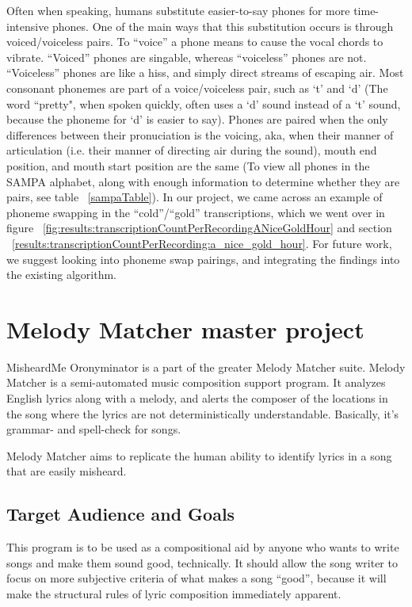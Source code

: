 Often when speaking, humans substitute easier-to-say phones for more time-intensive phones.  One of the main ways that this substitution occurs is through voiced/voiceless pairs.  To “voice” a phone means to cause the vocal chords to vibrate.  “Voiced” phones are singable, whereas “voiceless” phones are not.  “Voiceless” phones are like a hiss, and simply direct streams of escaping air.  Most consonant phonemes are part of a voice/voiceless pair, such as `t' and `d' (The word ``pretty", when spoken quickly, often uses a `d' sound instead of a `t' sound, because the phoneme for `d' is easier to say). Phones are paired when the only differences between their pronuciation is the voicing, aka, when their manner of articulation (i.e. their manner of directing air during the sound), mouth end position, and mouth start position are the same (To view all phones in the SAMPA alphabet, along with enough information to determine whether they are pairs, see table ~\ref{sampaTable}). In our project, we came across an example of phoneme swapping in the ``cold''/``gold'' transcriptions, which we went over in figure ~\ref{fig:results:transcriptionCountPerRecordingANiceGoldHour} and section ~\ref{results:transcriptionCountPerRecording:a_nice_gold_hour}. For future work, we suggest looking into phoneme swap pairings, and integrating the findings into the existing algorithm. 


\section{Melody Matcher master project}
\label{melodyMatcherMasterProject}
MisheardMe Oronyminator is a part of the greater Melody Matcher suite. Melody Matcher is a semi-automated music composition support program. It analyzes English lyrics along with a melody, and alerts the composer of the locations in the song where the lyrics are not deterministically understandable. Basically, it's grammar- and spell-check for songs. 

\vspace{14pt}
Melody Matcher aims to replicate the human ability to identify lyrics in a song that are easily misheard. 
\vspace{14pt}

\subsection{Target Audience and Goals}
This program is to be used as a compositional aid by anyone who wants to write songs and make them sound good, technically. It should allow the song writer to focus on more subjective criteria of what makes a song ``good'', because it will make the structural rules of lyric composition immediately apparent.

